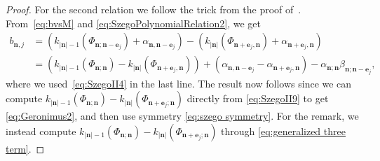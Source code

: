\documentclass[reqno,centertags,11pt,draft]{amsart}
\begin{document}
\begin{proof}
    For the second relation we follow the trick from the proof of~\cite[Thm 13.1.7]{OPUC2}. From~\eqref{eq:bvsM} and \eqref{eq:SzegoPolynomialRelation2}, we get
    \begin{align}
        b_{\bm{n},j} & =  (k_{|\bm{n}|-1}(\Phi_{\bm{n};\bm{n}-\bm{e}_j}) +\alpha_{\bm{n},\bm{n}-\bm{e}_j}) - (k_{|\bm{n}|}(\Phi_{\bm{n}+\bm{e}_j,\bm{n}})+\alpha_{\bm{n}+\bm{e}_j,\bm{n}})
        \\
        & =
        (k_{|\bm{n}|-1}(\Phi_{\bm{n};\bm{n}}) - k_{|\bm{n}|}(\Phi_{\bm{n}+\bm{e}_j,\bm{n}}) )
        +(\alpha_{\bm{n},\bm{n}-\bm{e}_j} - \alpha_{\bm{n}+\bm{e}_j,\bm{n}})
        - \alpha_{\bm{n};\bm{n}} \beta_{\bm{n};\bm{n}-\bm{e}_j},
    \end{align}
    where we used~\eqref{eq:SzegoII4} in the last line. The result now follows since we can compute $k_{|\bm{n}|-1}(\Phi_{\bm{n};\bm{n}}) - k_{|\bm{n}|}(\Phi_{\bm{n}+\bm{e}_j;\bm{n}})$ directly from \eqref{eq:SzegoII9} to get \eqref{eq:Geronimus2}, and then use symmetry \eqref{eq:szego symmetry}. For the remark, we instead compute $k_{|\bm{n}|-1}(\Phi_{\bm{n};\bm{n}}) - k_{|\bm{n}|}(\Phi_{\bm{n}+\bm{e}_j;\bm{n}})$ through \eqref{eq:generalized three term}.



\end{proof}
\end{document}
